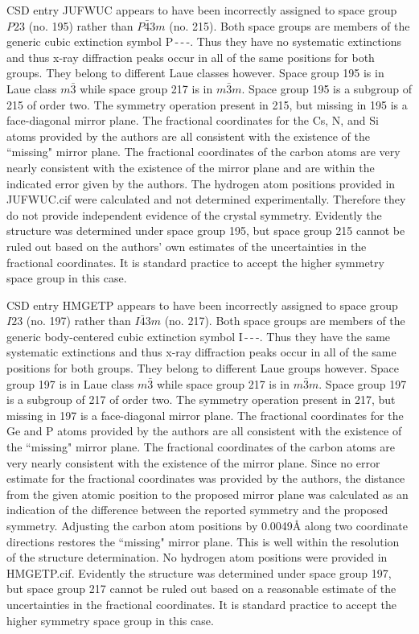 \documentclass[preprint]{iucr}              %
\begin{document}
CSD entry JUFWUC \cite{Tesh92} appears to have been incorrectly assigned to space group $P23$ (no. 195) rather than $P\bar{4}3m$ (no. 215).  Both space groups are members of the generic cubic extinction symbol P\,-\,-\,-.  Thus they have no systematic extinctions and thus x-ray diffraction peaks occur in all of the same positions for both groups.  They belong to different Laue classes however.  Space group 195 is in Laue class $m\bar{3}$ while space group 217 is in $m\bar{3}m$.  Space group 195 is a subgroup of 215 of order two.  The symmetry operation present in 215, but missing in 195 is a face-diagonal mirror plane.  The fractional coordinates for the Cs, N, and Si atoms provided by the authors are all consistent with the existence of the ``missing" mirror plane.  The fractional coordinates of the carbon atoms are very nearly consistent with the existence of the mirror plane and are within the indicated error given by the authors.  The hydrogen atom positions provided in JUFWUC.cif were calculated and not determined experimentally.  Therefore they do not provide independent evidence of the crystal symmetry.  Evidently the structure was determined under space group 195, but space group 215 cannot be ruled out based on the authors’ own estimates of the uncertainties in the fractional coordinates.  It is standard practice to accept the higher symmetry space group in this case.

CSD entry HMGETP \cite{Dahl75} appears to have been incorrectly assigned to space group $I23$ (no. 197) rather than $I\bar{4}3m$ (no. 217).  Both space groups are members of the generic body-centered cubic extinction symbol I\,-\,-\,-.  Thus they have the same systematic extinctions and thus x-ray diffraction peaks occur in all of the same positions for both groups.  They belong to different Laue groups however.  Space group 197 is in Laue class $m\bar{3}$ while space group 217 is in $m\bar{3}m$.    Space group 197 is a subgroup of 217 of order two.  The symmetry operation present in 217, but missing in 197 is a face-diagonal mirror plane.  The fractional coordinates for the Ge and P atoms provided by the authors are all consistent with the existence of the ``missing" mirror plane.  The fractional coordinates of the carbon atoms are very nearly consistent with the existence of the mirror plane.  Since no error estimate for the fractional coordinates was provided by the authors, the distance from the given atomic position to the proposed mirror plane was calculated as an indication of the difference between the reported symmetry and the proposed symmetry.  Adjusting the carbon atom positions by 0.0049\AA{} along two coordinate directions restores the ``missing" mirror plane.  This is well within the resolution of the structure determination.  No hydrogen atom positions were provided in HMGETP.cif.  Evidently the structure was determined under space group 197, but space group 217 cannot be ruled out based on a reasonable estimate of the uncertainties in the fractional coordinates.  It is standard practice to accept the higher symmetry space group in this case.
\end{document}
